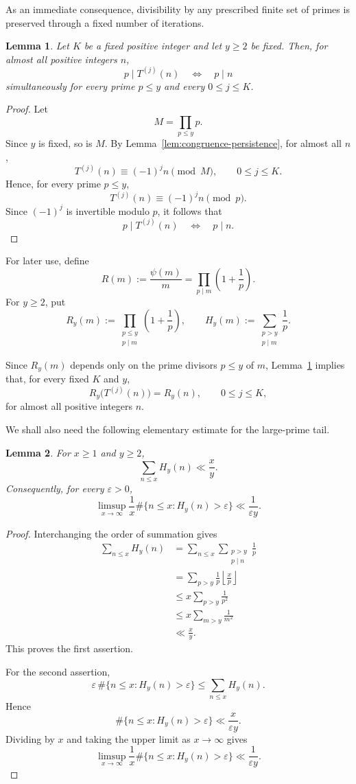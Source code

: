 \documentclass{article}
\newtheorem{lemma}{Lemma}
\begin{document}
As an immediate consequence, divisibility by any prescribed finite
set of primes is preserved through a fixed number of iterations.

\begin{lemma}\label{lem:small-prime-persistence}
Let $K$ be a fixed positive integer and let $y\ge2$ be fixed.
Then, for almost all positive integers $n$,
\[
p\mid T^{(j)}(n)
\quad\Longleftrightarrow\quad
p\mid n
\]
simultaneously for every prime $p\le y$ and every
$0\le j\le K$.
\end{lemma}

\begin{proof}
Let
\[
M=\prod_{p\le y}p.
\]
Since $y$ is fixed, so is $M$. By
Lemma~\ref{lem:congruence-persistence}, for almost all $n$,
\[
T^{(j)}(n)\equiv(-1)^jn\pmod M,
\qquad
0\le j\le K.
\]
Hence, for every prime $p\le y$,
\[
T^{(j)}(n)\equiv(-1)^jn\pmod p.
\]
Since $(-1)^j$ is invertible modulo $p$, it follows that
\[
p\mid T^{(j)}(n)
\quad\Longleftrightarrow\quad
p\mid n.
\]
\end{proof}

For later use, define
\[
R(m)
:=
\frac{\psi(m)}m
=
\prod_{p\mid m}\left(1+\frac1p\right).
\]
For $y\ge2$, put
\[
R_y(m)
:=
\prod_{\substack{p\le y\\p\mid m}}
\left(1+\frac1p\right),
\qquad
H_y(m)
:=
\sum_{\substack{p>y\\p\mid m}}\frac1p.
\]

Since $R_y(m)$ depends only on the prime divisors $p\le y$ of $m$,
Lemma~\ref{lem:small-prime-persistence} implies that, for every
fixed $K$ and $y$,
\[
R_y\bigl(T^{(j)}(n)\bigr)
=
R_y(n),
\qquad
0\le j\le K,
\]
for almost all positive integers $n$.

We shall also need the following elementary estimate for the
large-prime tail.

\begin{lemma}\label{lem:large-prime-tail}
For $x\ge1$ and $y\ge2$,
\[
\sum_{n\le x}H_y(n)
\ll
\frac{x}{y}.
\]
Consequently, for every $\varepsilon>0$,
\[
\limsup_{x\to\infty}
\frac1x
\#\{n\le x:H_y(n)>\varepsilon\}
\ll
\frac1{\varepsilon y}.
\]
\end{lemma}

\begin{proof}
Interchanging the order of summation gives
\[
\begin{aligned}
\sum_{n\le x}H_y(n)
&=
\sum_{n\le x}
\sum_{\substack{p>y\\p\mid n}}\frac1p\\
&=
\sum_{p>y}\frac1p
\left\lfloor\frac{x}{p}\right\rfloor\\
&\le
x\sum_{p>y}\frac1{p^2}\\
&\le
x\sum_{m>y}\frac1{m^2}\\
&\ll
\frac{x}{y}.
\end{aligned}
\]
This proves the first assertion.

For the second assertion,
\[
\varepsilon\,
\#\{n\le x:H_y(n)>\varepsilon\}
\le
\sum_{n\le x}H_y(n).
\]
Hence
\[
\#\{n\le x:H_y(n)>\varepsilon\}
\ll
\frac{x}{\varepsilon y}.
\]
Dividing by $x$ and taking the upper limit as $x\to\infty$ gives
\[
\limsup_{x\to\infty}
\frac1x
\#\{n\le x:H_y(n)>\varepsilon\}
\ll
\frac1{\varepsilon y}.
\]
\end{proof}
\end{document}

